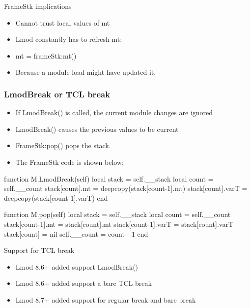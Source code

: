 \documentclass{beamer}
\begin{document}
\begin{frame}{FrameStk implications}
  \begin{itemize}
    \item Cannot trust local values of mt
    \item Lmod constantly has to refresh mt:
    \item {\color{blue}mt = frameStk:mt()}
    \item Because a module load might have updated it.
  \end{itemize}
\end{frame}

\begin{frame}[fragile]
    \frametitle{LmodBreak or TCL break}
  \begin{itemize}
    \item If LmodBreak() is called, the current module changes are
      ignored
    \item LmodBreak() causes the previous values to be current
    \item FrameStk:pop() pops the stack.
    \item The FrameStk code is shown below:
  \end{itemize}
 {\tiny
    \begin{semiverbatim}
function M.LmodBreak(self)
   local stack           = self.\_\_stack
   local count           = self.\_\_count
   stack[count].mt       = deepcopy(stack[count-1].mt)
   stack[count].varT     = deepcopy(stack[count-1].varT)
end

function M.pop(self)
   local stack           = self.\_\_stack
   local count           = self.\_\_count
   stack[count-1].mt     = stack[count].mt
   stack[count-1].varT   = stack[count].varT
   stack[count]          = nil
   self.__count          = count - 1
end
    \end{semiverbatim}
}
\end{frame}

\begin{frame}{Support for TCL break}
  \begin{itemize}
    \item Lmod 8.6+ added support LmodBreak()
    \item Lmod 8.6+ added support a bare TCL break
    \item Lmod 8.7+ added support for regular break and bare break
  \end{itemize}
\end{frame}
\end{document}
